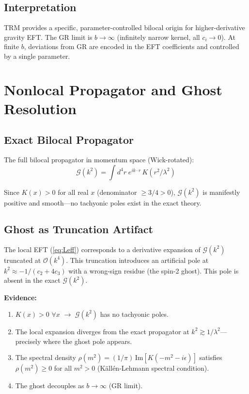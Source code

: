 \documentclass[12pt]{article}
\begin{document}
\subsection{Interpretation}

TRM provides a specific, parameter-controlled bilocal origin for higher-derivative gravity EFT. The GR limit is $b\to\infty$ (infinitely narrow kernel, all $c_i\to 0$). At finite $b$, deviations from GR are encoded in the EFT coefficients and controlled by a single parameter.

\section{Nonlocal Propagator and Ghost Resolution}
\label{sec:ghost}

\subsection{Exact Bilocal Propagator}

The full bilocal propagator in momentum space (Wick-rotated):
\begin{equation}
\mathcal{G}(k^2) = \int d^4r\; e^{ik\cdot r}\,K(r^2/\lambda^2)
\end{equation}

Since $K(x) > 0$ for all real $x$ (denominator $\geq 3/4 > 0$), $\mathcal{G}(k^2)$ is manifestly positive and smooth---no tachyonic poles exist in the exact theory.

\subsection{Ghost as Truncation Artifact}

The local EFT (\ref{eq:Leff}) corresponds to a derivative expansion of $\mathcal{G}(k^2)$ truncated at $\mathcal{O}(k^4)$. This truncation introduces an artificial pole at $k^2 \approx -1/(c_2+4c_3)$ with a wrong-sign residue (the spin-2 ghost). This pole is absent in the exact $\mathcal{G}(k^2)$.

\textbf{Evidence:}
\begin{enumerate}
\item $K(x) > 0$ $\forall x$ $\to$ $\mathcal{G}(k^2)$ has no tachyonic poles.
\item The local expansion diverges from the exact propagator at $k^2 \gtrsim 1/\lambda^2$---precisely where the ghost pole appears.
\item The spectral density $\rho(m^2) = (1/\pi)\,\text{Im}[K(-m^2-i\epsilon)]$ satisfies $\rho(m^2) \geq 0$ for all $m^2 > 0$ (K\"all\'en-Lehmann spectral condition).
\item The ghost decouples as $b\to\infty$ (GR limit).
\end{enumerate}
\end{document}
